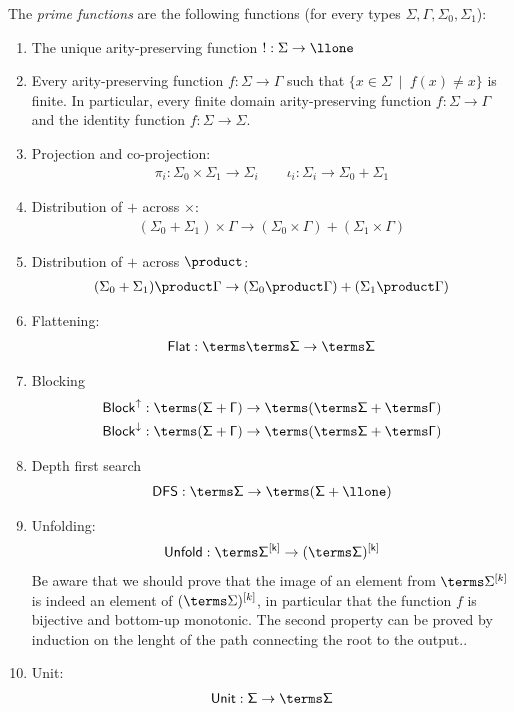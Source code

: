 \begin{definition}\label{def:prime-functions} The \emph{prime functions} are the following functions (for every types $\Sigma,\Gamma,\Sigma_0,\Sigma_1$): 
\begin{enumerate}
    \item The unique arity-preserving function $! : \Sigma \to \llone$
    \item Every arity-preserving function $f : \Sigma \to \Gamma$ such that    $\{x \in \Sigma \ \mid \ f(x)\neq x\}$ is finite. In particular, every finite domain arity-preserving function $f : \Sigma \to \Gamma$ and the identity function $f : \Sigma \to \Sigma$.
    \item Projection and co-projection:
    \begin{align*}
        \pi_i : \Sigma_0 \times \Sigma_1 \to \Sigma_i \qquad \iota_i : \Sigma_i \to \Sigma_0 + \Sigma_1
    \end{align*}
    \item Distribution of $+$ across $\times$:
\begin{align*}
    (\Sigma_0 + \Sigma_1 ) \times \Gamma \to (\Sigma_0 \times \Gamma) + (\Sigma_1 \times \Gamma)
\end{align*}
\item Distribution of $+$ across $\product$:
\begin{align*}
    (\Sigma_0 + \Sigma_1 ) \product \Gamma \to (\Sigma_0 \product \Gamma) + (\Sigma_1 \product \Gamma)
\end{align*}
\item Flattening:
\begin{align*}
    \sf{Flat}: \terms \terms \Sigma \to \terms \Sigma
\end{align*}
\item Blocking
    \begin{align*}
        \sf{Block}^{\uparrow}:\terms (\Sigma + \Gamma) \to \terms (\terms \Sigma + \terms \Gamma)\\
        \sf{Block}^{\downarrow}:\terms (\Sigma + \Gamma) \to \terms (\terms \Sigma + \terms \Gamma)
    \end{align*}
    \item Depth first search
    \begin{align*}
        \sf{DFS}:\terms \Sigma \to \terms (\Sigma+\llone)
    \end{align*}
    \item Unfolding: 
\begin{align*}
    \sf{Unfold}:\terms \Sigma^{[k]} \to (\terms \Sigma)^{[k]}
\end{align*}
Be aware that we should prove that the image of an element from $\terms \Sigma^{[k]}$ is indeed an element of $(\terms \Sigma)^{[k]}$, in particular that the function $f$ is bijective and bottom-up monotonic. The second property can be proved by induction on the lenght of the path connecting the root to the output..
    \item Unit:
\begin{align*}
    \sf{Unit}:\Sigma  \to \terms \Sigma
\end{align*}


\end{enumerate}
\end{definition}
